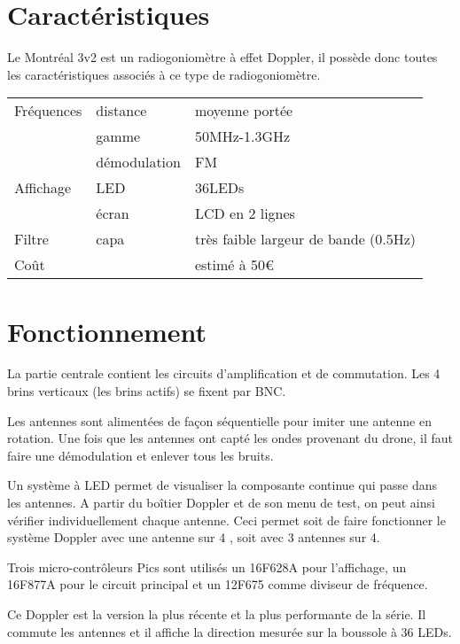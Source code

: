 \section{Caractéristiques}

Le Montréal 3v2 est un radiogoniomètre à effet Doppler, il possède donc toutes les caractéristiques associés à ce type de radiogoniomètre.
~\\

\begin{tabular}{ l l l}
Fréquences & distance & moyenne portée\\
 & gamme & 50MHz-1.3GHz\\
 & démodulation & FM\\
Affichage & LED & 36LEDs\\
& écran & LCD en 2 lignes\\
Filtre & capa & très faible largeur de bande (0.5Hz)\\
Coût & & estimé à 50\euro \\
\end{tabular}


\section{Fonctionnement}
La partie centrale contient les circuits d'amplification et de commutation. Les 4 brins verticaux (les brins actifs) se fixent par BNC.

Les antennes sont alimentées de façon séquentielle pour imiter une antenne en rotation. Une fois que les antennes ont capté les ondes provenant du drone, il faut faire une démodulation et enlever tous les bruits.


Un système à LED permet de visualiser la composante continue qui passe dans les antennes. A partir du boîtier Doppler et de son menu de test, on peut ainsi vérifier individuellement chaque antenne. Ceci permet soit de faire fonctionner le système Doppler avec une antenne sur 4 %
, soit avec 3 antennes sur 4. %


Trois micro-contrôleurs Pics sont utilisés un 16F628A pour l'affichage, un 16F877A pour le circuit principal et un 12F675 comme diviseur de fréquence.

Ce Doppler est la version la plus récente et la plus performante de la série. Il commute les antennes et il affiche la direction mesurée sur la boussole à 36 LEDs. 
~\\

